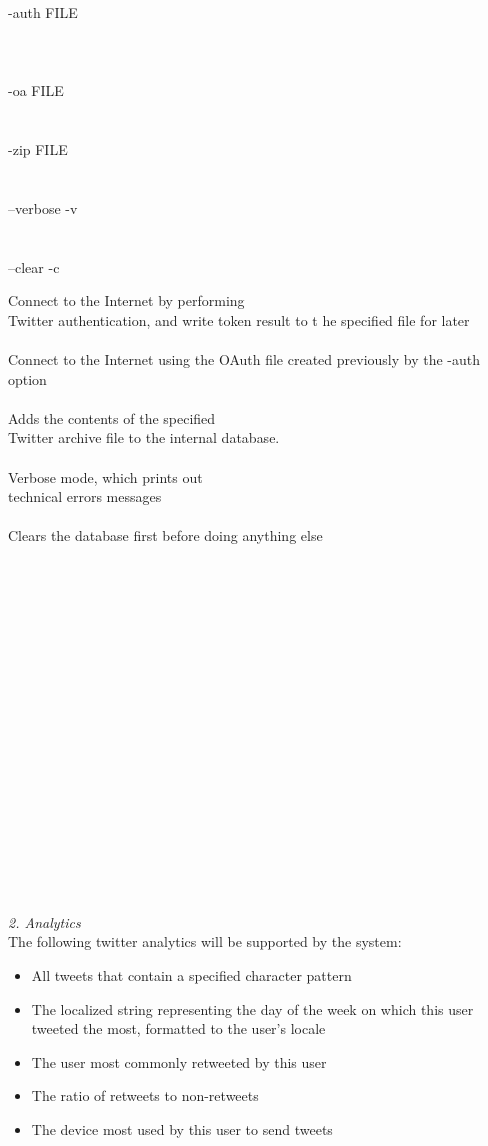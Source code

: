 \documentclass{article}
\begin{document}
\parbox[t][3cm][t]{7cm}{\normalsize -auth FILE\\
\\
\\
\\
-oa FILE\\
\\
\\
-zip FILE\\
\\
\\
--verbose -v
\\
\\
\\
--clear -c
} 
\parbox[t][3cm][t]{7cm}{\normalsize Connect to the Internet by performing \\Twitter authentication, and write token result to t he specified file for later\\
\\
Connect to the Internet using the OAuth file created previously by the -auth option\\
\\
Adds the contents of the specified \\Twitter archive file to the internal database.\\
\\
Verbose mode, which prints out \\technical errors messages\\
\\
Clears the database first before doing anything else}
\\
\\
\\
\\
\\
\\
\\
\\
\\
\\
\\
\\
\\
\\
\\
\\
\\
\\
\textit{\Large 2. Analytics}
\\
The following twitter analytics will be supported by the system:
\begin{itemize}
\item All tweets that contain a specified character pattern
\item The localized string representing the day of the week on which this user tweeted the most, formatted to the user's locale
\item The user most commonly retweeted by this user
\item The ratio of retweets to non-retweets
\item The device most used by this user to send tweets
\end{itemize} 
\end{document}

